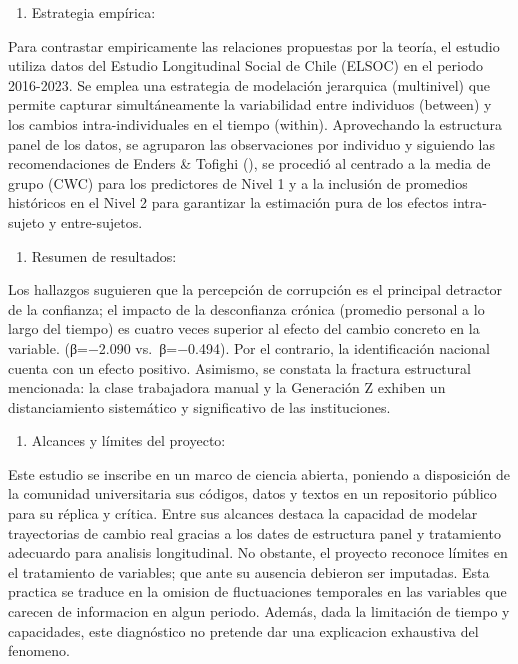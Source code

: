 \documentclass[
  spanish,
  a4paper,
  oneside]{scrbook}
\providecommand{\tightlist}{%
  \setlength{\itemsep}{0pt}\setlength{\parskip}{0pt}}
\begin{document}
\begin{enumerate}
\def\labelenumi{\arabic{enumi}.}
\setcounter{enumi}{2}
\tightlist
\item
  Estrategia empírica:
\end{enumerate}

Para contrastar empiricamente las relaciones propuestas por la teoría,
el estudio utiliza datos del Estudio Longitudinal Social de Chile
(ELSOC) en el periodo 2016-2023. Se emplea una estrategia de modelación
jerarquica (multinivel) que permite capturar simultáneamente la
variabilidad entre individuos (between) y los cambios intra-individuales
en el tiempo (within). Aprovechando la estructura panel de los datos, se
agruparon las observaciones por individuo y siguiendo las
recomendaciones de Enders \& Tofighi
(), se procedió al centrado a
la media de grupo (CWC) para los predictores de Nivel 1 y a la inclusión
de promedios históricos en el Nivel 2 para garantizar la estimación pura
de los efectos intra-sujeto y entre-sujetos.

\begin{enumerate}
\def\labelenumi{\arabic{enumi}.}
\setcounter{enumi}{3}
\tightlist
\item
  Resumen de resultados:
\end{enumerate}

Los hallazgos suguieren que la percepción de corrupción es el principal
detractor de la confianza; el impacto de la desconfianza crónica
(promedio personal a lo largo del tiempo) es cuatro veces superior al
efecto del cambio concreto en la variable. (β=−2.090 vs.~β=−0.494). Por
el contrario, la identificación nacional cuenta con un efecto positivo.
Asimismo, se constata la fractura estructural mencionada: la clase
trabajadora manual y la Generación Z exhiben un distanciamiento
sistemático y significativo de las instituciones.

\begin{enumerate}
\def\labelenumi{\arabic{enumi}.}
\setcounter{enumi}{4}
\tightlist
\item
  Alcances y límites del proyecto:
\end{enumerate}

Este estudio se inscribe en un marco de ciencia abierta, poniendo a
disposición de la comunidad universitaria sus códigos, datos y textos en
un repositorio público para su réplica y crítica. Entre sus alcances
destaca la capacidad de modelar trayectorias de cambio real gracias a
los dates de estructura panel y tratamiento adecuardo para analisis
longitudinal. No obstante, el proyecto reconoce límites en el
tratamiento de variables; que ante su ausencia debieron ser imputadas.
Esta practica se traduce en la omision de fluctuaciones temporales en
las variables que carecen de informacion en algun periodo. Además, dada
la limitación de tiempo y capacidades, este diagnóstico no pretende dar
una explicacion exhaustiva del fenomeno.
\end{document}
